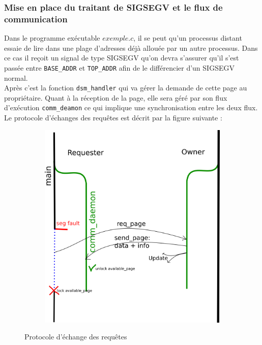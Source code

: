 \subsubsection{Mise en place du traitant de SIGSEGV et le flux de communication}
\setlength{\parindent}{5ex}
Dans le programme exécutable $exemple.c$, il se peut qu'un processus distant essaie de lire dans une plage d'adresses déjà allouée par un autre processus. Dans ce cas il reçoit un signal de type SIGSEGV qu'on devra s'assurer qu'il s'est passée entre \texttt{BASE\_ADDR} et \texttt{TOP\_ADDR} afin de le différencier d'un SIGSEGV normal.\\
Après c'est la fonction \texttt{dsm\_handler} qui va gérer la demande de cette page au propriétaire. Quant à la réception de la page, elle sera géré par son flux d'exécution \texttt{comm\_deamon} ce qui implique une synchronisation entre les deux flux.\\
Le protocole d'échanges des requêtes  est décrit par la figure suivante : 
\begin{figure}[H]
     \centering
     \begin{subfigure}[H]{0.9\textwidth}
         \centering
         \includegraphics[width=\textwidth]{protocol.png}
     \end{subfigure}
     \caption{Protocole d'échange des requêtes}
\end{figure}
